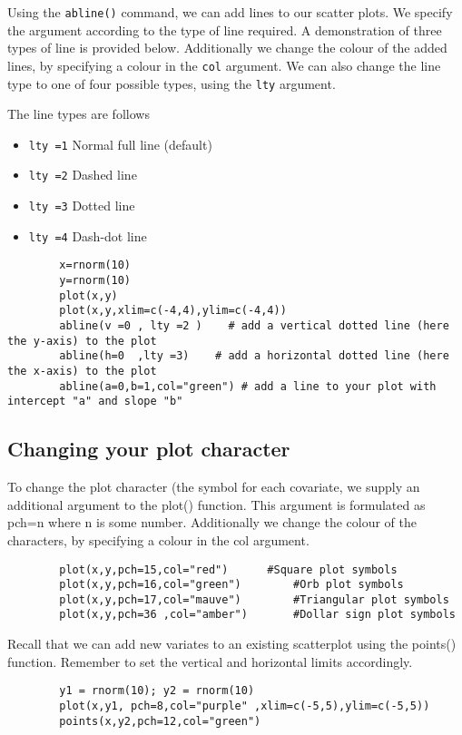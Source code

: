 \documentclass[a4paper,12pt]{article}
\begin{document}
\begin{itemize}
		Using the \texttt{abline()} command, we can add lines to our scatter plots. We specify the argument according to the type of line required. A demonstration of three types of line is provided below.
		Additionally we change the colour of the added lines, by specifying a colour in the \texttt{col} argument. We can also change the line type to one of four possible types, using the \texttt{lty} argument.
		
		The line types are follows
		\begin{itemize}
			\item	\texttt{lty =1}   Normal full line (default)
			\item	\texttt{lty =2}   Dashed line
			\item	\texttt{lty =3}   Dotted line
			\item	\texttt{lty =4}   Dash-dot line
		\end{itemize}
		\large \begin{verbatim}
		x=rnorm(10)
		y=rnorm(10)
		plot(x,y)
		plot(x,y,xlim=c(-4,4),ylim=c(-4,4))
		abline(v =0 , lty =2 )    # add a vertical dotted line (here the y-axis) to the plot
		abline(h=0  ,lty =3)    # add a horizontal dotted line (here the x-axis) to the plot
		abline(a=0,b=1,col="green") # add a line to your plot with intercept "a" and slope "b"
		\end{verbatim}\large
		
		\subsection{Changing your plot character}
		
		To change the plot character (the symbol for each covariate, we supply an additional argument to the plot() function.  This argument is formulated as pch=n where n is some number.
		Additionally we change the colour of the characters, by specifying a colour in the col argument.
		\large \begin{verbatim}
		plot(x,y,pch=15,col="red")		#Square plot symbols
		plot(x,y,pch=16,col="green")		#Orb plot symbols
		plot(x,y,pch=17,col="mauve")		#Triangular plot symbols
		plot(x,y,pch=36	,col="amber")		#Dollar sign plot symbols
		\end{verbatim}\large
		Recall that we can add new variates to an existing scatterplot using the points() function. Remember to set the vertical and horizontal limits accordingly.
		\large \begin{verbatim}
		y1 = rnorm(10); y2 = rnorm(10)
		plot(x,y1, pch=8,col="purple" ,xlim=c(-5,5),ylim=c(-5,5))
		points(x,y2,pch=12,col="green")
		\end{verbatim}\large

\end{itemize}
\end{document}
